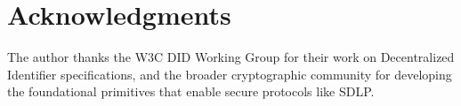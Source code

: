 \documentclass[conference]{IEEEtran}
\begin{document}
\section*{Acknowledgments}

The author thanks the W3C DID Working Group for their work on Decentralized Identifier specifications, and the broader cryptographic community for developing the foundational primitives that enable secure protocols like SDLP.



\end{document}

